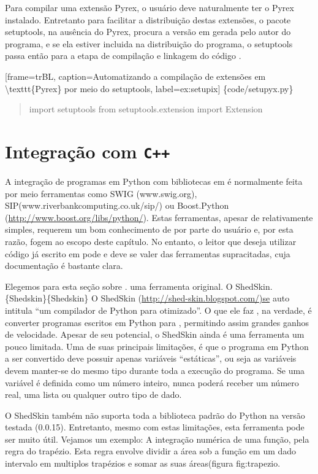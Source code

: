 \documentclass[a4paper,10pt,portuguese]{sphinxmanual}
\begin{document}
Para compilar uma extensão Pyrex, o usuário deve naturalmente ter o
Pyrex instalado. Entretanto para facilitar a distribuição destas
extensões, o pacote setuptools, na ausência do Pyrex, procura a
versão em  gerada pelo autor do programa, e se ela estiver
incluida na distribuição do programa, o setuptools passa então para
a etapa de compilação e linkagem do código .

{[}frame=trBL, caption=Automatizando a compilação de extensões em \textbackslash{}texttt\{Pyrex\} por meio do setuptools, label=ex:setupix{]} \{code/setupyx.py\}
\begin{quote}

import setuptools from setuptools.extension import Extension
\end{quote}


\chapter{Integração com \texttt{C++}}
\label{capext:integracao-com-c}
A integração de programas em Python com bibliotecas em  é
normalmente feita por meio ferramentas como SWIG (www.swig.org),
SIP(www.riverbankcomputing.co.uk/sip/) ou Boost.Python
(\href{http://www.boost.org/libs/python/}{http://www.boost.org/libs/python/}). Estas ferramentas, apesar de
relativamente simples, requerem um bom conhecimento de  por
parte do usuário e, por esta razão, fogem ao escopo deste capítulo.
No entanto, o leitor que deseja utilizar código já escrito em
 pode e deve se valer das ferramentas supracitadas, cuja
documentação é bastante clara.

Elegemos para esta seção sobre . uma ferramenta original. O
ShedSkin. \{Shedskin\}\{Shedskin\} O ShedSkin
(\href{http://shed-skin.blogspot.com/)se}{http://shed-skin.blogspot.com/)se} auto intitula
``um compilador de Python para  otimizado''. O que ele faz ,
na verdade, é converter programas escritos em Python para ,
permitindo assim grandes ganhos de velocidade. Apesar de seu
potencial, o ShedSkin ainda é uma ferramenta um pouco limitada. Uma
de suas principais limitações, é que o programa em Python a ser
convertido deve possuir apenas variáveis ``estáticas'', ou seja as
variáveis devem manter-se do mesmo tipo durante toda a execução do
programa. Se uma variável é definida como um número inteiro, nunca
poderá receber um número real, uma lista ou qualquer outro tipo de
dado.

O ShedSkin também não suporta toda a biblioteca padrão do Python na
versão testada (0.0.15). Entretanto, mesmo com estas limitações,
esta ferramenta pode ser muito útil. Vejamos um exemplo: A
integração numérica de uma função, pela regra do trapézio. Esta
regra envolve dividir a área sob a função em um dado intervalo em
multiplos trapézios e somar as suas áreas(figura fig:trapezio.
\end{document}
